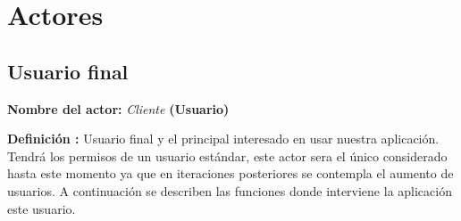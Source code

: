 \section{Actores}

\subsection{Usuario final}
\textbf{Nombre del actor:} \textit{Cliente} \textbf{(Usuario)}\par
\textbf{Definición :} Usuario final y el principal interesado en usar nuestra aplicación. Tendrá los permisos de un usuario estándar, este actor sera el único considerado hasta este momento ya que en iteraciones posteriores se contempla el aumento de usuarios. A continuación se describen las funciones donde interviene la aplicación este usuario.